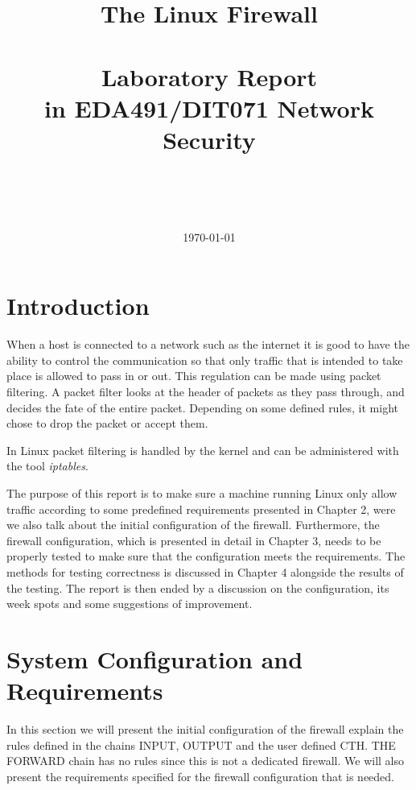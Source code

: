 \documentclass[a4paper,12pt]{report}
\title{The Linux Firewall\\\mbox{}\\Laboratory Report \\in EDA491/DIT071 Network Security}
\author{\firstauthor\\\secondauthor\\\mbox{}\\\groupnumber}
\date{\today}
\begin{document}
\renewcommand{\thepage}{\roman{page}}
\maketitle
\tableofcontents
{}

\chapter{Introduction}
\setcounter{page}{1}
\renewcommand{\thepage}{\arabic{page}}

When a host is connected to a network such as the internet it is good to have the ability to control the communication so that only traffic that is intended to take place is allowed to pass in or out. This regulation can be made using packet filtering. A packet filter looks at the header of packets as they pass through, and decides the fate of the entire packet. Depending on some defined rules, it might chose to drop the packet or accept them.

In Linux  packet filtering is handled by the kernel and can be administered with the tool \emph{iptables}.

The purpose of this report is to make sure a machine running Linux only allow traffic according to some predefined requirements presented in Chapter 2, were we also talk about the initial configuration of the firewall. Furthermore, the firewall configuration, which is presented in detail in Chapter 3, needs to be properly tested to make sure that the configuration meets the requirements. The methods for testing correctness is discussed in Chapter 4 alongside the results of the testing. The report is then ended by a discussion on the configuration, its week spots and some suggestions of improvement.


\chapter{System Configuration and Requirements}
\label{ch:setup}

% 
% 

In this section we will present the initial configuration of the firewall explain the rules defined in the chains INPUT, OUTPUT and the user defined CTH. THE FORWARD chain has no rules since this is not a dedicated firewall. We will also present the requirements specified for the firewall configuration that is needed.
\end{document}
